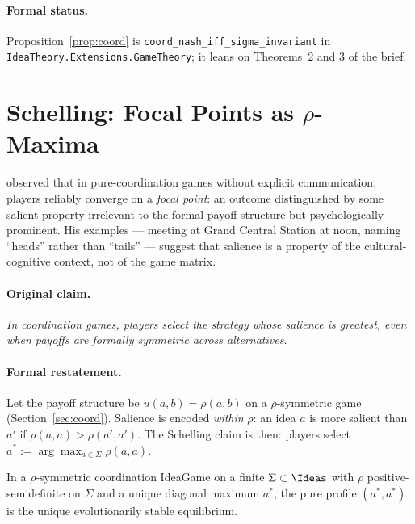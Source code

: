 \paragraph{Formal status.} Proposition~\ref{prop:coord} is
\texttt{coord\_nash\_iff\_sigma\_invariant} in
\texttt{IdeaTheory.Extensions.GameTheory}; it leans on Theorems~2 and 3
of the brief.

\section{Schelling: Focal Points as $\rho$-Maxima}
\label{sec:schelling}

\citet{Schelling1960} observed that in pure-coordination games without
explicit communication, players reliably converge on a \emph{focal point}:
an outcome distinguished by some salient property irrelevant to the formal
payoff structure but psychologically prominent. His examples — meeting at
Grand Central Station at noon, naming ``heads'' rather than ``tails'' —
suggest that salience is a property of the cultural-cognitive context, not
of the game matrix.

\paragraph{Original claim.} \emph{In coordination games, players select
the strategy whose salience is greatest, even when payoffs are formally
symmetric across alternatives.}

\paragraph{Formal restatement.} Let the payoff structure be
$u(a,b) = \rho(a,b)$ on a $\rho$-symmetric game (Section~\ref{sec:coord}).
Salience is encoded \emph{within} $\rho$: an idea $a$ is more salient
than $a'$ if $\rho(a,a) > \rho(a',a')$. The Schelling claim is then:
players select $a^\ast := \arg\max_{a\in\Sigma}\rho(a,a)$.

\begin{theorem}
\label{thm:schelling}
In a $\rho$-symmetric coordination IdeaGame on a finite $\Sigma\subset
\Ideas$ with $\rho$ positive-semidefinite on $\Sigma$ and a unique
diagonal maximum $a^\ast$, the pure profile $(a^\ast,a^\ast)$ is the
unique evolutionarily stable equilibrium.
\end{theorem}

